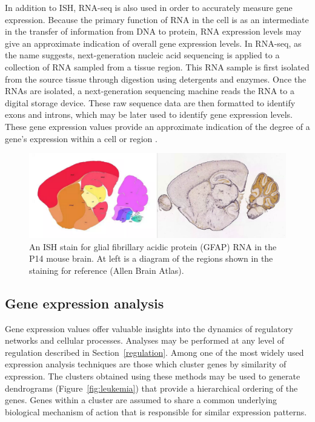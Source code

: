 \documentclass[12pt,oneside,onecolumn,a4paper]{article}
\begin{document}
In addition to ISH, RNA-seq is also used in order to accurately measure gene expression. Because the primary function of RNA in the cell is as an intermediate in the transfer of information from DNA to protein, RNA expression levels may give an approximate indication of overall gene expression levels. In RNA-seq, as the name suggests, next-generation nucleic acid sequencing is applied to a collection of RNA sampled from a tissue region. This RNA sample is first isolated from the source tissue through digestion using detergents and enzymes. Once the RNAs are isolated, a next-generation sequencing machine reads the RNA to a digital storage device. These raw sequence data are then formatted to identify exons and introns, which may be later used to identify gene expression levels. These gene expression values provide an approximate indication of the degree of a gene's expression within a cell or region \citep{Wang_2009}.

\begin{figure}[h!]
\begin{center}
\includegraphics[width=0.8\columnwidth]{figures/ISH/ISH}
\caption{An ISH stain for glial fibrillary acidic protein (GFAP) RNA in the P14 mouse brain. At left is a diagram of the regions shown in the staining for reference (Allen Brain Atlas).\label{fig:ish}
}
\end{center}
\end{figure}

\subsection{Gene expression analysis}\label{gene_analysis}

Gene expression values offer valuable insights into the dynamics of regulatory networks and cellular processes. Analyses may be performed at any level of regulation described in Section~\ref{regulation}. Among one of the most widely used expression analysis techniques are those which cluster genes by similarity of expression. The clusters obtained using these methods may be used to generate dendrograms (Figure~\ref{fig:leukemia}) that provide a hierarchical ordering of the genes. Genes within a cluster are assumed to share a common underlying biological mechanism of action that is responsible for similar expression patterns.
\end{document}
